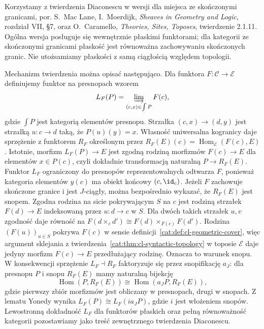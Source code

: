 Korzystamy z twierdzenia Diaconescu w wersji dla miejsca ze skończonymi granicami, por. S.~Mac Lane, I.~Moerdijk, \emph{Sheaves in Geometry and Logic}, rozdział VII, \S7, oraz O.~Caramello, \emph{Theories, Sites, Toposes}, twierdzenie 2.1.11. Ogólna wersja posługuje się wewnętrznie płaskimi funktorami; dla kategorii ze skończonymi granicami płaskość jest równoważna zachowywaniu skończonych granic. Nie utożsamiamy płaskości z samą ciągłością względem topologii.

Mechanizm twierdzenia można opisać następująco. Dla funktora $F:\mathcal C\to\mathcal E$ definiujemy funktor na presnopach wzorem
\[
 L_F(P)=\varinjlim_{(c,x)\in\int P}F(c),
\]
gdzie $\int P$ jest kategorią elementów presnopu. Strzałka $(c,x)\to(d,y)$ jest strzałką $u:c\to d$ taką, że $P(u)(y)=x$. Własność uniwersalna kogranicy daje sprzężenie z funktorem $R_F$ określonym przez $R_F(E)(c)=\operatorname{Hom}_{\mathcal E}(F(c),E)$. Istotnie, morfizm $L_F(P)\to E$ jest zgodną rodziną morfizmów $F(c)\to E$ dla elementów $x\in P(c)$, czyli dokładnie transformacją naturalną $P\to R_F(E)$. Funktor $L_F$ ograniczony do presnopów reprezentowalnych odtwarza $F$, ponieważ kategoria elementów $y(c)$ ma obiekt końcowy $(c,\id_c)$. Jeżeli $F$ zachowuje skończone granice i jest $J$-ciągły, można bezpośrednio wykazać, że $R_F(E)$ jest snopem. Zgodna rodzina na sicie pokrywającym $S$ na $c$ jest rodziną strzałek $F(d)\to E$ indeksowaną przez $u:d\to c$ w $S$. Dla dwóch takich strzałek $u,v$ zgodność daje równość na $F(d\times_c d')\cong F(d)\times_{F(c)}F(d')$. Rodzina $(F(u))_{u\in S}$ pokrywa $F(c)$ w sensie definicji~\ref{cat:def:cl-geometric-cover}, więc argument sklejania z twierdzenia~\ref{cat:thm:cl-syntactic-topology} w toposie $\mathcal E$ daje jedyny morfizm $F(c)\to E$ przedłużający rodzinę. Oznacza to warunek snopu. W konsekwencji sprzężenie $L_F\dashv R_F$ faktoryzuje się przez snopifikację $a_J$: dla presnopu $P$ i snopu $R_F(E)$ mamy naturalną bijekcję
\[
 \operatorname{Hom}(P,R_F(E))\cong\operatorname{Hom}(a_J P,R_F(E)),
\]
gdzie pierwszy zbiór morfizmów jest obliczany w presnopach, drugi w snopach. Z lematu Yonedy wynika $L_F(P)\cong L_F(i a_J P)$, gdzie $i$ jest włożeniem snopów. Lewostronną dokładność $L_F$ dla funktorów płaskich oraz pełną równoważność kategorii pozostawiamy jako treść zewnętrznego twierdzenia Diaconescu.

